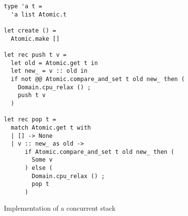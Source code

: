 \begin{figure}[tp]
\begin{verbatim}
type 'a t =
  'a list Atomic.t

let create () =
  Atomic.make []

let rec push t v =
  let old = Atomic.get t in
  let new_ = v :: old in
  if not @@ Atomic.compare_and_set t old new_ then (
    Domain.cpu_relax () ;
    push t v
  )

let rec pop t =
  match Atomic.get t with
  | [] -> None
  | v :: new_ as old ->
      if Atomic.compare_and_set t old new_ then (
        Some v
      ) else (
        Domain.cpu_relax () ;
        pop t
      )
\end{verbatim}
\caption{Implementation of a concurrent stack}
\label{fig:stack}
\end{figure}